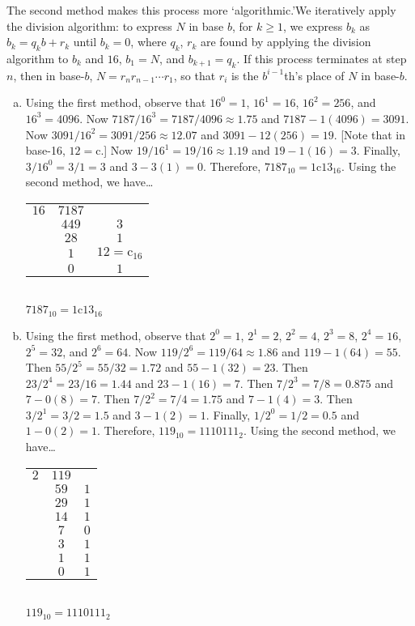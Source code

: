 \documentclass[11pt,letterpaper]{article}
\begin{document}
The second method makes this process more `algorithmic.'We iteratively apply the division algorithm: to express $N$ in base $b$, for $k \geq 1$, we express $b_k$ as $b_k= q_k b + r_k$ until $b_k= 0$, where $q_k$, $r_k$ are found by applying the division algorithm to $b_k$ and $16$, $b_1= N$, and $b_{k+1}= q_k$. If this process terminates at step $n$, then in base-$b$, $N= r_n r_{n-1} \cdots r_1$, so that $r_i$ is the $b^{i-1}$th's place of $N$ in base-$b$.

\begin{enumerate}[(a)]
\item Using the first method, observe that $16^0= 1$, $16^1= 16$, $16^2= 256$, and $16^3= 4096$. Now $7187/16^3= 7187/4096 \approx 1.75$ and $7187 - 1(4096)= 3091$. Now $3091/16^2= 3091/256 \approx 12.07$ and $3091 - 12(256)= 19$. [Note that in base-16, $12= \text{c}$.] Now $19/16^1= 19/16 \approx 1.19$ and $19 - 1(16)= 3$. Finally, $3/16^0= 3/1= 3$ and $3 - 3(1)= 0$. Therefore, $7187_{10}= 1\text{c}13_{16}$. Using the second method, we have\dots
	\begin{table}[H]
	\centering
	\begin{tabular}{cc|c}
	\multicolumn{1}{c|}{$16$} & $7187$ & \cellcolor[HTML]{d3d3d3} \\ \cline{2-3} 
	& $449$ & $3$ \\
	& $28$ & $1$ \\
	& $1$ & $12= \text{c}_{16}$ \\
	& $0$ & $1$
	\end{tabular} \\[0.3cm]
	$7187_{10}= 1\text{c}13_{16}$
	\end{table} \pspace

\item Using the first method, observe that $2^0= 1$, $2^1= 2$, $2^2= 4$, $2^3= 8$, $2^4= 16$, $2^5= 32$, and $2^6= 64$. Now $119/2^6= 119/64 \approx 1.86$ and $119 - 1(64)= 55$. Then $55/2^5= 55/32= 1.72$ and $55 - 1(32)= 23$. Then $23/2^4= 23/16= 1.44$ and $23 - 1(16)= 7$. Then $7/2^3= 7/8= 0.875$ and $7 - 0(8)= 7$. Then $7/2^2= 7/4= 1.75$ and $7 - 1(4)= 3$. Then $3/2^1= 3/2= 1.5$ and $3 - 1(2)= 1$. Finally, $1/2^0= 1/2= 0.5$ and $1 - 0(2)= 1$. Therefore, $119_{10}= 1110111_2$. Using the second method, we have\dots
	\begin{table}[H]
	\centering
	\begin{tabular}{cc|c}
	\multicolumn{1}{c|}{$2$} & $119$ & \cellcolor[HTML]{d3d3d3} \\ \cline{2-3} 
	& $59$ & $1$ \\
	& $29$ & $1$ \\
	& $14$ & $1$ \\
	& $7$ & $0$ \\
	& $3$ & $1$ \\
	& $1$ & $1$ \\
	& $0$ & $1$
	\end{tabular} \\[0.3cm]
	$119_{10}= 1110111_2$
	\end{table} \pspace


\end{enumerate}
\end{document}
